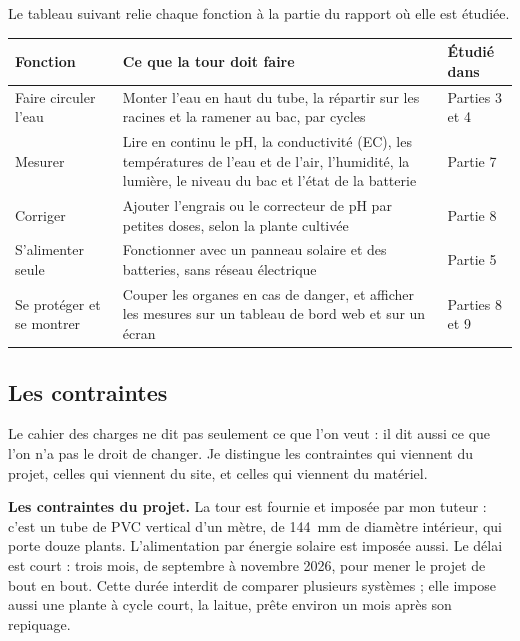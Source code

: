 \begin{center}
\renewcommand{\arraystretch}{1.15}

Le tableau suivant relie chaque fonction à la partie du rapport où elle est étudiée.

\begin{tabularx}{\textwidth}{|>{\raggedright\arraybackslash}p{2.4cm}|Y|>{\raggedright\arraybackslash}p{2.6cm}|}
\hline
\textbf{Fonction} & \textbf{Ce que la tour doit faire} & \textbf{Étudié dans} \\
\hline
Faire circuler l'eau & Monter l'eau en haut du tube, la répartir sur les racines et la ramener au bac, par cycles & Parties 3 et 4 \\
\hline
Mesurer & Lire en continu le pH, la conductivité (EC), les températures de l'eau et de l'air, l'humidité, la lumière, le niveau du bac et l'état de la batterie & Partie 7 \\
\hline
Corriger & Ajouter l'engrais ou le correcteur de pH par petites doses, selon la plante cultivée & Partie 8 \\
\hline
S'alimenter seule & Fonctionner avec un panneau solaire et des batteries, sans réseau électrique & Partie 5 \\
\hline
Se protéger et se montrer & Couper les organes en cas de danger, et afficher les mesures sur un tableau de bord web et sur un écran & Parties 8 et 9 \\
\hline
\end{tabularx}
\end{center}

\subsection{Les contraintes}

Le cahier des charges ne dit pas seulement ce que l'on veut : il dit aussi ce que l'on n'a pas le droit de changer. Je distingue les contraintes qui viennent du projet, celles qui viennent du site, et celles qui viennent du matériel.

\textbf{Les contraintes du projet.} La tour est fournie et imposée par mon tuteur : c'est un tube de PVC vertical d'un mètre, de \qty{144}{mm} de diamètre intérieur, qui porte douze plants. L'alimentation par énergie solaire est imposée aussi. Le délai est court : trois mois, de septembre à novembre 2026, pour mener le projet de bout en bout. Cette durée interdit de comparer plusieurs systèmes ; elle impose aussi une plante à cycle court, la laitue, prête environ un mois après son repiquage.

